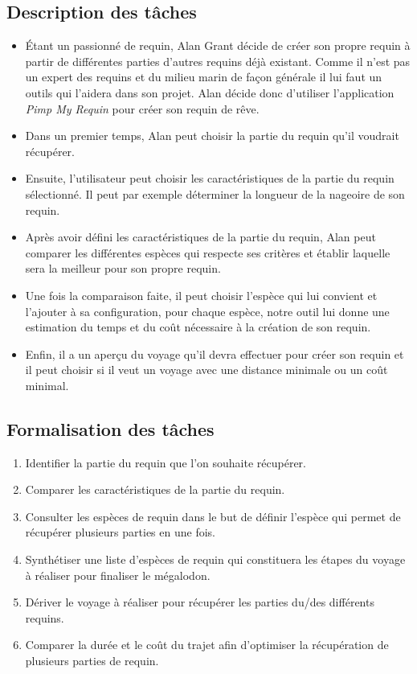 \documentclass{article}
\begin{document}
\subsection{Description des tâches}
\begin{itemize}
    \item Étant un passionné de requin, Alan Grant décide de créer son propre requin à partir de différentes parties d'autres requins déjà existant. Comme il n'est pas un expert des requins et du milieu marin de façon générale il lui faut un outils qui l'aidera dans son projet. Alan décide donc d'utiliser l'application \textit{Pimp My Requin} pour créer son requin de rêve.
    \item Dans un premier temps, Alan peut choisir la partie du requin qu'il voudrait récupérer.
    \item Ensuite, l'utilisateur peut choisir les caractéristiques de la partie du requin sélectionné. Il peut par exemple déterminer la longueur de la nageoire de son requin.
    \item Après avoir défini les caractéristiques de la partie du requin, Alan peut comparer les différentes espèces qui respecte ses critères et établir laquelle sera la meilleur pour son propre requin. 
    \item Une fois la comparaison faite, il peut choisir l'espèce qui lui convient et l'ajouter à sa configuration, pour chaque espèce, notre outil lui donne une estimation du temps et du coût nécessaire à la création de son requin.
    \item Enfin, il a un aperçu du voyage qu'il devra effectuer pour créer son requin et il peut choisir si il veut un voyage avec une distance minimale ou un coût minimal.
\end{itemize}

\subsection{Formalisation des tâches}
\begin{enumerate}
	\item Identifier la partie du requin que l’on souhaite récupérer.
	\item Comparer les caractéristiques de la partie du requin.
	\item Consulter les espèces de requin dans le but de définir l’espèce qui permet de récupérer plusieurs parties en une fois.
	\item Synthétiser une liste d’espèces de requin qui constituera les étapes du voyage à réaliser pour finaliser le mégalodon.
	\item Dériver le voyage à réaliser pour récupérer les parties du/des différents requins.
	\item Comparer la durée et le coût du trajet afin d’optimiser la récupération de plusieurs parties de requin.
\end{enumerate}
\end{document}
